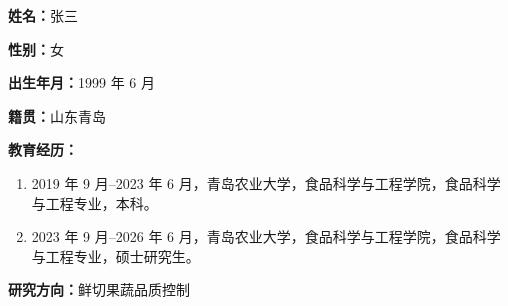 \label{chap:resume}

\vspace{0.5\baselineskip}

{\songti\fontsize{12bp}{18bp}\selectfont
	
	\noindent\textbf{姓名：}张三\par
	
	\noindent\textbf{性别：}女\par
	
	\noindent\textbf{出生年月：}1999 年 6 月\par
	
	\noindent\textbf{籍贯：}山东青岛\par
	
	\noindent\textbf{教育经历：}
	\begin{enumerate}[leftmargin=3em,itemsep=0pt,topsep=5pt,partopsep=0pt,parsep=0pt]
		\item 2019 年 9 月--2023 年 6 月，青岛农业大学，食品科学与工程学院，食品科学与工程专业，本科。
		\item 2023 年 9 月--2026 年 6 月，青岛农业大学，食品科学与工程学院，食品科学与工程专业，硕士研究生。
	\end{enumerate}
	
	\noindent\textbf{研究方向：}鲜切果蔬品质控制\par
	
}